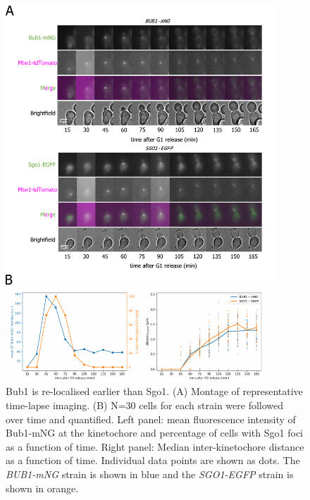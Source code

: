\begin{figure}[htbp]
  \centering
  \includegraphics[width=0.9\textwidth]{chapter3/figures/Bub1-mNG Sgo1-EGFP.pdf}
  \caption[Bub1 is re-localised earlier than Sgo1]{Bub1 is re-localised earlier than Sgo1. (A) Montage of representative time-lapse imaging. (B) N=30 cells for each strain were followed over time and quantified. Left panel: mean fluorescence intensity of Bub1-mNG at the kinetochore and percentage of cells with Sgo1 foci as a function of time. Right panel: Median inter-kinetochore distance as a function of time. Individual data points are shown as dots. The \textit{BUB1-mNG} strain is shown in blue and the \textit{SGO1-EGFP} strain is shown in orange.}
  \label{fig:bub1sgo1}
\end{figure} 

